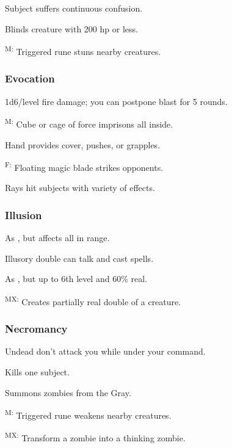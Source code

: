 	 Subject suffers continuous confusion.

	 Blinds creature with 200 hp or less.

	\textsuperscript{M:} Triggered rune stuns nearby creatures.

\subsubsection{Evocation}
	 1d6/level fire damage; you can postpone blast for 5 rounds.

	\textsuperscript{M:} Cube or cage of force imprisons all inside.

	 Hand provides cover, pushes, or grapples.

	\textsuperscript{F:} Floating magic blade strikes opponents.

	 Rays hit subjects with variety of effects.

\subsubsection{Illusion}
	 As , but affects all in range.

	 Illusory double can talk and cast spells.

	 As , but up to 6th level and 60\% real.

	\textsuperscript{MX:} Creates partially real double of a creature.

\subsubsection{Necromancy}
	 Undead don't attack you while under your command.
	
	 Kills one subject.
	
	 Summons zombies from the Gray. %

	\textsuperscript{M:} Triggered rune weakens nearby creatures.

	\textsuperscript{MX:} Transform a zombie into a thinking 
	zombie. %
	

